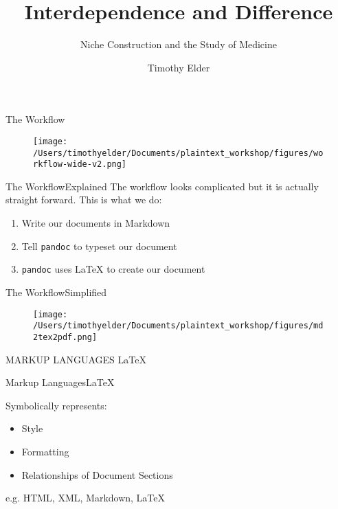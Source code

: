 \documentclass{beamer}
\title{Interdependence and Difference}
\subtitle{Niche Construction and the Study of Medicine}
\author{Timothy Elder}
\institute
{
  Department of Sociology \\
  University of Chicago
}
\begin{document}
\begin{frame}
\titlepage
\end{frame}
\begin{frame}{The Workflow}
    \begin{figure}
    \texttt{[image: /Users/timothyelder/Documents/plaintext\_workshop/figures/workflow-wide-v2.png]}
    \end{figure}
\end{frame}

\begin{frame}{The Workflow}{Explained}
    The workflow looks complicated but it is actually straight forward. This is what we do: \newline
    \begin{enumerate}
        \pause
        \item Write our documents in Markdown
        \pause
        \item Tell \texttt{pandoc} to typeset our document
        \pause
        \item \texttt{pandoc} uses LaTeX to create our document
    \end{enumerate}
\end{frame}

\begin{frame}{The Workflow}{Simplified}
    \begin{figure}
    \texttt{[image: /Users/timothyelder/Documents/plaintext\_workshop/figures/md2tex2pdf.png]}
    \end{figure}
\end{frame}

\begin{frame}
    \Huge{MARKUP LANGUAGES} \newline
    \large{\LaTeX}
\end{frame}

\begin{frame}{Markup Languages}{\LaTeX}

    Symbolically represents:
    \begin{itemize}
        \item Style
        \item Formatting
        \item Relationships of Document Sections\newline
    \end{itemize}

    \footnotesize{e.g. HTML, XML, Markdown, \LaTeX}

\end{frame}
\end{document}
